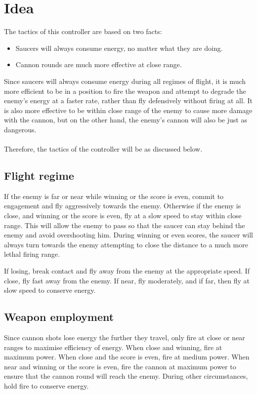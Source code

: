 \newpage

\section{Idea}

The tactics of this controller are based on two facts:

\begin{itemize}
	\item Saucers will always consume energy, no matter what they are doing.
	\item Cannon rounds are much more effective at close range.
\end{itemize}

Since saucers will always consume energy during all regimes of flight, it is much more efficient to be in a position to fire the weapon and attempt to degrade the enemy's energy at a faster rate, rather than fly defensively without firing at all. It is also more effective to be within close range of the enemy to cause more damage with the cannon, but on the other hand, the enemy's cannon will also be just as dangerous.\\
\\
Therefore, the tactics of the controller will be as discussed below.

\subsection{Flight regime}

If the enemy is far or near while winning or the score is even, commit to engagement and fly aggressively towards the enemy. Otherwise if the enemy is close, and winning or the score is even, fly at a slow speed to stay within close range. This will allow the enemy to pass so that the saucer can stay behind the enemy and avoid overshooting him. During winning or even scores, the saucer will always turn towards the enemy attempting to close the distance to a much more lethal firing range.

If losing, break contact and fly away from the enemy at the appropriate speed. If close, fly fast away from the enemy. If near, fly moderately, and if far, then fly at slow speed to conserve energy.

\subsection{Weapon employment}

Since cannon shots lose energy the further they travel, only fire at close or near ranges to maximise efficiency of energy. When close and winning, fire at maximum power. When close and the score is even, fire at medium power. When near and winning or the score is even, fire the cannon at maximum power to ensure that the cannon round will reach the enemy. During other circumstances, hold fire to conserve energy.